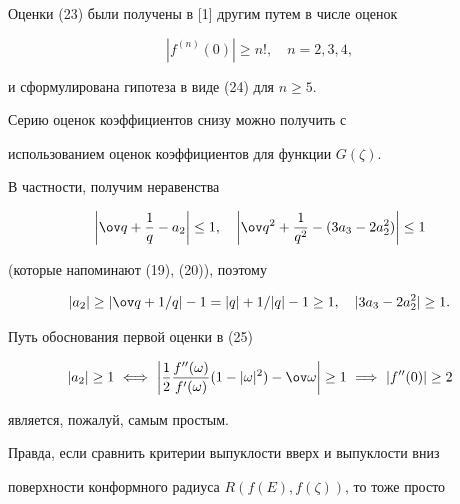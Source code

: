  


\begin{note} 


Оценки (23) были получены в [1] другим путем в числе оценок 


\begin{equation} 


|f^{(n)}(0)|\ge n!,\quad n=2,3,4, 


\end{equation} 


и сформулирована гипотеза в виде (24) для $n\ge5$. 


\end{note} 


 


\begin{note} 


Серию оценок коэффициентов снизу можно получить с 


использованием оценок коэффициентов для функции $G(\zeta)$. 


В частности, получим неравенства 


$$ 


\bigg|\ov q+\frac{1}{q}-a_2\bigg|\le1,\quad 


\bigg|\ov q{}^2+\frac{1}{q^2}-(3a_3-2a^2_2)\bigg|\le1 


$$ 


(которые напоминают (19), (20)), поэтому 


\begin{equation} 


|a_2|\ge|\ov q+1/q|-1=|q|+1/|q|-1\ge1,\quad 


|3a_3-2a^2_2|\ge1. 


\end{equation} 


Путь обоснования первой оценки в (25) 


$$ 


|a_2|\ge1\ \Longleftrightarrow\ \bigg|\frac{1}{2} 


\frac{f''(\omega)}{f'(\omega)}(1-|\omega|^2)-\ov\omega\bigg| 


\ge1\ \Longrightarrow\ |f''(0)|\ge2 


$$ 


является, пожалуй, самым простым. 


 


Правда, если сравнить критерии выпуклости вверх и выпуклости вниз 


поверхности конформного радиуса $R(f(E),f(\zeta))$, то тоже просто 



\end{note}
